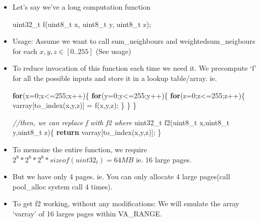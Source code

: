 \documentclass[]{book}
\newenvironment{Shaded}{}{}
\newcommand{\KeywordTok}[1]{\textbf{{#1}}}
\newcommand{\DataTypeTok}[1]{\textcolor[rgb]{0.50,0.00,0.00}{{#1}}}
\newcommand{\DecValTok}[1]{\textcolor[rgb]{0.00,0.00,1.00}{{#1}}}
\newcommand{\CommentTok}[1]{\textcolor[rgb]{0.50,0.50,0.50}{\textit{{#1}}}}
\newcommand{\NormalTok}[1]{{#1}}
\begin{document}
\begin{itemize}
\item
  Let's say we've a long computation function

\begin{Shaded}
\begin{Highlighting}[]
  \DataTypeTok{uint32_t} \NormalTok{f(}\DataTypeTok{uint8_t} \NormalTok{x, }\DataTypeTok{uint8_t} \NormalTok{y, }\DataTypeTok{uint8_t} \NormalTok{z);}
\end{Highlighting}
\end{Shaded}
\item
  Usage: Assume we want to call sum\_neighbours and
  weightedsum\_neigbours for each \(x,y,z \in [0..255]\) (See usage)
\item
  To reduce invocation of this function each time we need it. We
  precompute `f' for all the possible inputs and store it in a lookup
  table/array. ie.

\begin{Shaded}
\begin{Highlighting}[]
\KeywordTok{for}\NormalTok{(x=}\DecValTok{0}\NormalTok{;x<=}\DecValTok{255}\NormalTok{;x++)\{}
 \KeywordTok{for}\NormalTok{(y=}\DecValTok{0}\NormalTok{;y<=}\DecValTok{255}\NormalTok{;y++)\{}
  \KeywordTok{for}\NormalTok{(z=}\DecValTok{0}\NormalTok{;z<=}\DecValTok{255}\NormalTok{;z++)\{}
    \NormalTok{varray[to_index(x,y,z)] = f(x,y,z);}
  \NormalTok{\}}
 \NormalTok{\}}
\NormalTok{\}}

\CommentTok{//then, we can replace f with f2 where}
\DataTypeTok{uint32_t} \NormalTok{f2(}\DataTypeTok{uint8_t} \NormalTok{x,}\DataTypeTok{uint8_t} \NormalTok{y,}\DataTypeTok{uint8_t} \NormalTok{z)\{}
  \KeywordTok{return} \NormalTok{varray[to_index(x,y,z)];}
\NormalTok{\}}
\end{Highlighting}
\end{Shaded}
\item
  To memoize the entire function, we require
  \(2^8 * 2^8 * 2^8 * sizeof(uint32_t) = 64MB\) ie. 16 large pages.
\item
  But we have only 4 pages. ie. You can only allocate 4 large pages(call
  pool\_alloc system call 4 times).
\item
  To get f2 working, without any modifications: We will emulate the
  array `varray' of 16 larges pages within VA\_RANGE.


\end{itemize}
\end{document}
